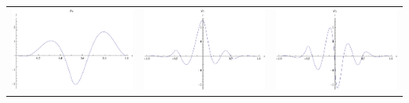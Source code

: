 \documentclass{article}
\begin{document}
\begin{landscape}
\begin{tabular}{ccc}
\includegraphics[width=6.7cm]{quintic_bspline_4.pdf}& \includegraphics[width=6.7cm]{quintic_bspline_5.pdf}& \includegraphics[width=6.7cm]{quintic_bspline_6.pdf} \\
\end{tabular} 
 \end{landscape}
\end{document}
